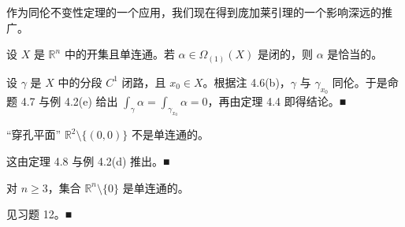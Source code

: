 作为同伦不变性定理的一个应用，我们现在得到庞加莱引理的一个影响深远的推广。

\begin{theorem}

设 $ X $ 是 $ \mathbb{R}^{n} $ 中的开集且单连通。若 $ \alpha \in \Omega_{(1)}(X) $ 是闭的，则 $ \alpha $ 是恰当的。

\proofhead
设 $ \gamma $ 是 $ X $ 中的分段 $ C^{1} $ 闭路，且 $ x_{0} \in X $。根据注 4.6(b)，$ \gamma $ 与 $ \gamma_{x_{0}} $ 同伦。于是命题 4.7 与例 4.2(e) 给出 $ \int_{\gamma}\alpha = \int_{\gamma_{x_{0}}}\alpha = 0 $，再由定理 4.4 即得结论。\nobreak\hspace{0.35em}■
\end{theorem}

\begin{example}

\begin{items}
\item

“穿孔平面” $ \mathbb{R}^{2}\setminus\{(0,0)\} $ 不是单连通的。

\proofhead
这由定理 4.8 与例 4.2(d) 推出。\nobreak\hspace{0.35em}■
\item

对 $ n \ge 3 $，集合 $ \mathbb{R}^{n}\setminus\{0\} $ 是单连通的。

\proofhead
见习题 12。\nobreak\hspace{0.35em}■
\end{items}

\end{example}

